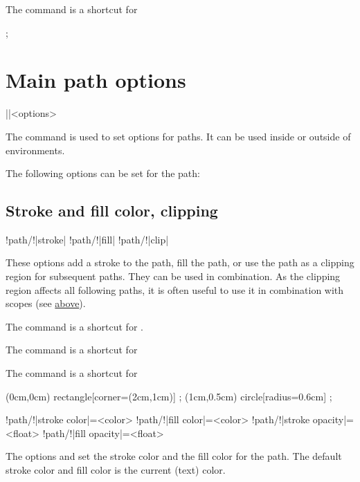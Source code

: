 \documentclass[a4paper]{article}
\begin{document}
{{The command \macro{\map} is a shortcut for 

\begin{codeexamplecolumns}
\begin{qdraw}
   ;
\end{qdraw}
\end{codeexamplecolumns}

\section{Main path options}

\begin{macrodef}
|\qdrawset|{<options>}
\end{macrodef}
The command \macro{\qdrawset} is used to set options for paths. It can be used inside or outside of  environments.

The following options can be set for the path:

\subsection{Stroke and fill color, clipping}

\begin{macrodef}
!path/!|stroke|
!path/!|fill|
!path/!|clip|
\end{macrodef}
These options add a stroke to the path, fill the path, or use the path as a clipping region for subsequent paths. They can be used in combination. As the clipping region affects all following paths, it is often useful to use it in combination with scopes (see \hyperlink{sec:scopes}{above}).

The command \macro{\stroke} is a shortcut for \macro{\path [stroke]}.

The command \macro{\fill} is a shortcut for \macro{\path [fill]}

The command \macro{\clip} is a shortcut for \macro{\path [clip]}

\begin{codeexamplecolumns}
\begin{qdraw}
   (0cm,0cm)
    rectangle[corner={(2cm,1cm)}] ;
  \fill (1cm,0.5cm)
    circle[radius={0.6cm}] ;
\end{qdraw}
\end{codeexamplecolumns}

\begin{macrodef}
!path/!|stroke color|={<color>}
!path/!|fill color|={<color>}
!path/!|stroke opacity|={<float>}
!path/!|fill opacity|={<float>}
\end{macrodef}
The options  and  set the stroke color and the fill color for the path. The default stroke color and fill color is the current (text) color.

}}
\end{document}
